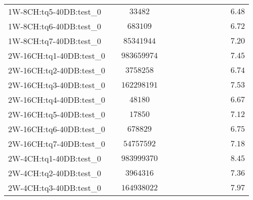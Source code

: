 \begin{tabular}{|l|c|c|c|c|c|c|c|c|c|c|c|}
1W-8CH:tq5-40DB:test\_0   & $          $ & $ 33482       $ & $       $ & $  $ & $    $ & $       $ & $  $ & $   $ & $             $ & $         $ & $ 6.48    $ \\
1W-8CH:tq6-40DB:test\_0   & $          $ & $ 683109      $ & $       $ & $  $ & $    $ & $       $ & $  $ & $   $ & $             $ & $         $ & $ 6.72    $ \\
1W-8CH:tq7-40DB:test\_0   & $          $ & $ 85341944    $ & $       $ & $  $ & $    $ & $       $ & $  $ & $   $ & $             $ & $         $ & $ 7.20    $ \\
2W-16CH:tq1-40DB:test\_0  & $          $ & $ 983659974   $ & $       $ & $  $ & $    $ & $       $ & $  $ & $   $ & $             $ & $         $ & $ 7.45    $ \\
2W-16CH:tq2-40DB:test\_0  & $          $ & $ 3758258     $ & $       $ & $  $ & $    $ & $       $ & $  $ & $   $ & $             $ & $         $ & $ 6.74    $ \\
2W-16CH:tq3-40DB:test\_0  & $          $ & $ 162298191   $ & $       $ & $  $ & $    $ & $       $ & $  $ & $   $ & $             $ & $         $ & $ 7.53    $ \\
2W-16CH:tq4-40DB:test\_0  & $          $ & $ 48180       $ & $       $ & $  $ & $    $ & $       $ & $  $ & $   $ & $             $ & $         $ & $ 6.67    $ \\
2W-16CH:tq5-40DB:test\_0  & $          $ & $ 17850       $ & $       $ & $  $ & $    $ & $       $ & $  $ & $   $ & $             $ & $         $ & $ 7.12    $ \\
2W-16CH:tq6-40DB:test\_0  & $          $ & $ 678829      $ & $       $ & $  $ & $    $ & $       $ & $  $ & $   $ & $             $ & $         $ & $ 6.75    $ \\
2W-16CH:tq7-40DB:test\_0  & $          $ & $ 54757592    $ & $       $ & $  $ & $    $ & $       $ & $  $ & $   $ & $             $ & $         $ & $ 7.18    $ \\
2W-4CH:tq1-40DB:test\_0   & $          $ & $ 983999370   $ & $       $ & $  $ & $    $ & $       $ & $  $ & $   $ & $             $ & $         $ & $ 8.45    $ \\
2W-4CH:tq2-40DB:test\_0   & $          $ & $ 3964316     $ & $       $ & $  $ & $    $ & $       $ & $  $ & $   $ & $             $ & $         $ & $ 7.36    $ \\
2W-4CH:tq3-40DB:test\_0   & $          $ & $ 164938022   $ & $       $ & $  $ & $    $ & $       $ & $  $ & $   $ & $             $ & $         $ & $ 7.97    $ \\

\end{tabular}
